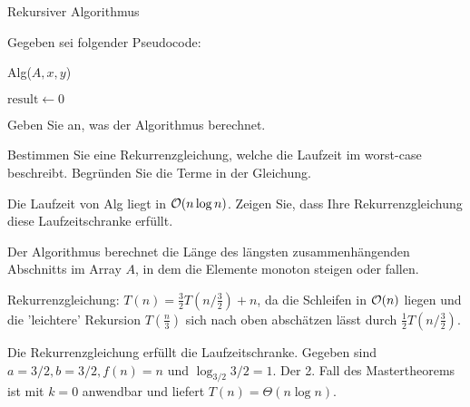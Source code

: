 \documentclass{exercisesheet}
\begin{document}
\begin{eexercises}{Rekursiver Algorithmus}{
    Gegeben sei folgender Pseudocode:
    \begin{algorithm}[ht]
      \caption{Alg($A,x,y$)}
      $\text{result} \gets 0$ \\
    \end{algorithm}
  }
  \item Geben Sie an, was der Algorithmus berechnet.
  \item Bestimmen Sie eine Rekurrenzgleichung, welche die Laufzeit im worst-case beschreibt. Begründen Sie die Terme in der Gleichung.
  \item Die Laufzeit von Alg liegt in $\mathcal{O}(n \log n)$. Zeigen Sie, dass Ihre Rekurrenzgleichung diese Laufzeitschranke erfüllt.
\end{eexercises}

\begin{solutions}
  \item Der Algorithmus berechnet die Länge des längsten zusammenhängenden Abschnitts im Array $A$, in dem die Elemente monoton steigen oder fallen.
  \item Rekurrenzgleichung: $T(n) = \frac{3}{2}T(n/\frac{3}{2}) + n$, da die Schleifen in $\mathcal{O}(n)$ liegen und die 'leichtere' Rekursion $T(\frac{n}{3})$ sich nach oben abschätzen lässt durch $\frac{1}{2}T(n/\frac{3}{2})$.
  \item Die Rekurrenzgleichung erfüllt die Laufzeitschranke. Gegeben sind $a=3/2, b=3/2, f(n)=n$ und $\log_{3/2}{3/2} = 1$. Der 2. Fall des Mastertheorems ist mit $k=0$ anwendbar und liefert $T(n) = \Theta(n \log n)$.
\end{solutions}
\end{document}

